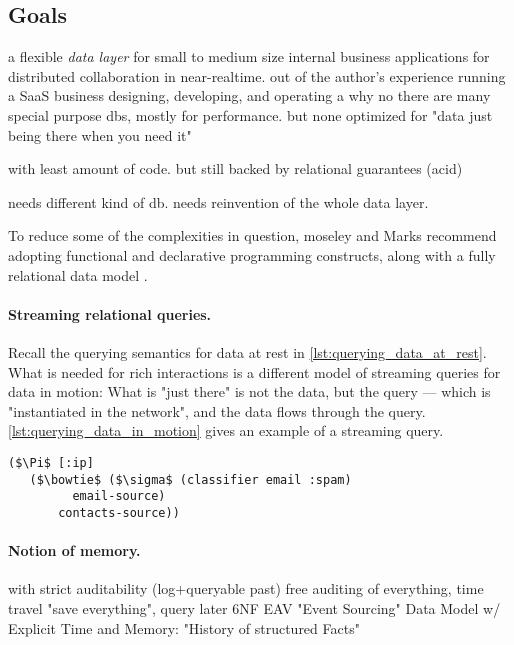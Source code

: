 \subsection{Goals}

a flexible \emph{data layer} for small to medium size internal business applications for distributed collaboration in near-realtime.
out of the author's experience running a SaaS business designing, developing, and operating a
why no there are many special purpose dbs, mostly for performance.
but none optimized for "data just being there when you need it"

with least amount of code. but still backed by relational guarantees (acid)

needs different kind of db.
needs reinvention of the whole data layer.



To reduce some of the complexities in question, moseley and Marks recommend adopting functional and declarative programming constructs, along with a fully relational data model \cite{tarpit}.

\paragraph{Streaming relational queries.}
Recall the querying semantics for data at rest in \autoref{lst:querying_data_at_rest}. What is needed for rich interactions is a different model of streaming queries for data in motion: What is "just there" is not the data, but the query — which is "instantiated in the network", and the data flows through the query. \autoref{lst:querying_data_in_motion} gives an example of a streaming query.

\begin{lstlisting}[label={lst:querying_data_in_motion},morekeywords={email-source,contacts-source},caption=Querying data in motion \cite{alvaro2015isee}]
($\Pi$ [:ip]
   ($\bowtie$ ($\sigma$ (classifier email :spam)
         email-source)
       contacts-source))
\end{lstlisting}




\paragraph{Notion of memory.}
with strict auditability (log+queryable past)
free auditing of everything, time travel
"save everything", query later
6NF EAV "Event Sourcing" Data Model w/ Explicit Time and Memory: "History of structured Facts"

